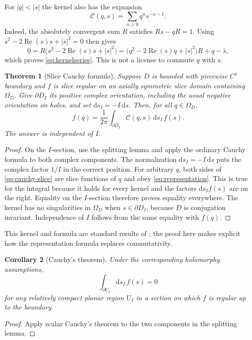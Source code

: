 \documentclass[11pt,a4paper]{article}
\numberwithin{equation}{section}
\newtheorem{theorem}{Theorem}[section]
\newtheorem{corollary}[theorem]{Corollary}
\theoremstyle{definition}
\theoremstyle{remark}
\newcommand{\Rea}{\operatorname{Re}}
\newcommand{\cC}{\mathcal C}
\begin{document}
For $|q|<|s|$ the kernel also has the expansion
\begin{equation}
 \cC(q,s)=\sum_{n\ge0}q^n s^{-n-1}.
 \label{eq:kernelseries}
\end{equation}
Indeed, the absolutely convergent sum $R$ satisfies $Rs-qR=1$.
Using $s^2-2\Rea(s)s+|s|^2=0$ then gives
\[
 0=R\bigl(s^2-2\Rea(s)s+|s|^2\bigr)
   =\bigl(q^2-2\Rea(s)q+|s|^2\bigr)R+q-\bar s,
\]
which proves \eqref{eq:kernelseries}. This is not a license to commute $q$
with $s$.

\begin{theorem}[Slice Cauchy formula]
\label{thm:cauchy-slice}
Suppose $D$ is bounded with piecewise $C^1$ boundary and $f$ is slice regular
on an axially symmetric slice domain containing $\overline{\Omega_D}$.
Give $\partial D_I$ its positive complex orientation, including the usual
negative orientation on holes, and set $\mathrm ds_I=-I\,\mathrm ds$.
Then, for all $q\in\Omega_D$,
\begin{equation}
 f(q)=\frac1{2\pi}\int_{\partial D_I}
          \cC(q,s)\,\mathrm ds_I\,f(s).
 \label{eq:cauchy-slice}
\end{equation}
The answer is independent of $I$.
\end{theorem}
\begin{proof}
On the $I$-section, use the splitting lemma and apply the ordinary Cauchy
formula to both complex components. The normalization $\mathrm ds_I=-I\,
\mathrm ds$ puts the complex factor $1/I$ in the correct position.
For arbitrary $q$, both sides of \eqref{eq:cauchy-slice} are slice functions
of $q$ and obey \eqref{eq:representation}. This is true for the integral
because it holds for every kernel and the factors $\mathrm ds_I f(s)$ are
on the right. Equality on the $I$-section therefore proves equality everywhere.
The kernel has no singularities in $\Omega_D$ when $s\in\partial D_I$,
because $D$ is conjugation invariant. Independence of $I$ follows from the
same equality with $f(q)$.
\end{proof}
This kernel and formula are standard results of \cite{CGS}; the proof here
makes explicit how the representation formula replaces commutativity.

\begin{corollary}[Cauchy's theorem]
Under the corresponding holomorphy assumptions,
\[
 \int_{\partial U_I}\mathrm ds_I\, f(s)=0
\]
for any relatively compact planar region $U_I$ in a section on which $f$
is regular up to the boundary.
\end{corollary}
\begin{proof}
Apply scalar Cauchy's theorem to the two components in the splitting lemma.
\end{proof}
\end{document}
